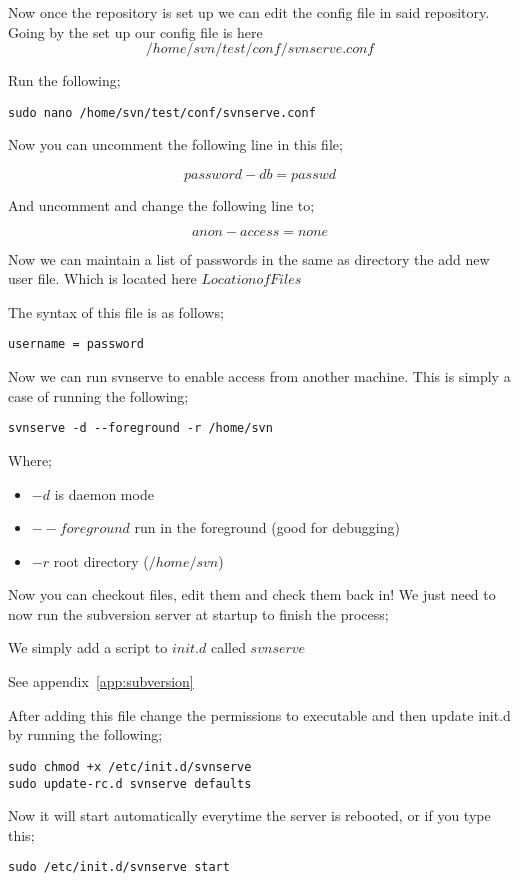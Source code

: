 Now once the repository is set up we can edit the config file in said repository.  Going by the set up our config file is here $$/home/svn/test/conf/svnserve.conf$$

Run the following;

\begin{lstlisting}
sudo nano /home/svn/test/conf/svnserve.conf
\end{lstlisting}

Now you can uncomment the following line in this file;

$$
password-db = passwd
$$

And uncomment and change the following line to;

$$
anon-access = none
$$

Now we can maintain a list of passwords in the same as directory the add new user file.  Which is located here
$Location of Files$

The syntax of this file is as follows;

\begin{lstlisting}
username = password
\end{lstlisting}

Now we can run svnserve to enable access from another machine.  This is simply a case of running the following;

\begin{lstlisting}
svnserve -d --foreground -r /home/svn
\end{lstlisting}

Where;
\begin{itemize}
\item $-d$ is daemon mode
\item $--foreground$ run in the foreground (good for debugging)
\item $-r$ root directory ($/home/svn$)
\end{itemize}


Now you can checkout files, edit them and check them back in!  We just need to now run the subversion server at startup to finish the process;

We simply add a script to $init.d$ called $svnserve$

See appendix~\ref{app:subversion}

After adding this file change the permissions to executable and then update init.d by running the following;

\begin{lstlisting}
sudo chmod +x /etc/init.d/svnserve
sudo update-rc.d svnserve defaults
\end{lstlisting}

Now it will start automatically everytime the server is rebooted, or if you type this;

\begin{lstlisting}
sudo /etc/init.d/svnserve start
\end{lstlisting}
